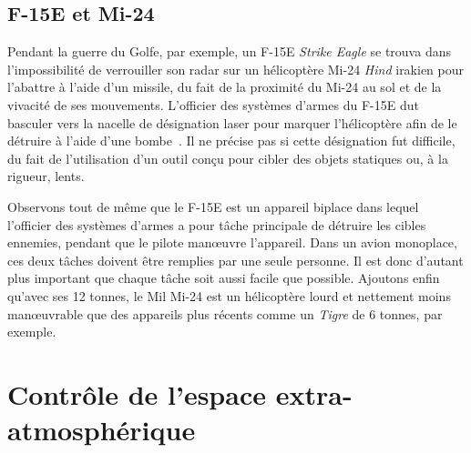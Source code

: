 \begin{appendices}
	\subsection{F-15E et Mi-24}
	\label{sub:f15e}
	Pendant la guerre du Golfe, par exemple, un F-15E \emph{Strike Eagle} se trouva dans l'impossibilité de verrouiller son radar sur un hélicoptère Mi-24 \emph{Hind} irakien pour l'abattre à l'aide d'un missile, du fait de la proximité du Mi-24 au sol et de la vivacité de ses mouvements. L'officier des systèmes d'armes du F-15E dut basculer vers la nacelle de désignation laser pour \og marquer \fg{} l'hélicoptère afin de le détruire à l'aide d'une bombe~\cite{craig2007debrief}. Il ne précise pas si cette désignation fut difficile, du fait de l'utilisation d'un outil conçu pour cibler des objets statiques ou, à la rigueur, lents.
	
	
	Observons tout de même que le F-15E est un appareil biplace dans lequel l'officier des systèmes d'armes a pour tâche principale de détruire les cibles ennemies, pendant que le pilote man\oe{}uvre l'appareil. Dans un avion monoplace, ces deux tâches doivent être remplies par une seule personne. Il est donc d'autant plus important que chaque tâche soit aussi facile que possible. Ajoutons enfin qu'avec ses 12 tonnes, le Mil Mi-24 est un hélicoptère lourd et nettement moins man\oe{}uvrable que des appareils plus récents comme un \emph{Tigre} de 6 tonnes, par exemple.


\FloatBarrier
\section{Contrôle de l'espace extra-atmosphérique}


\end{appendices}
